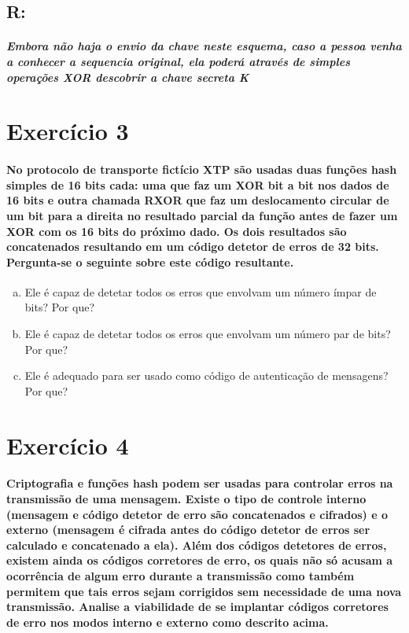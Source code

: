 \documentclass[10pt,a4paper]{report}
\begin{document}
\subsection*{R:}
\subparagraph{Embora não haja o envio da chave neste esquema, caso a pessoa venha a conhecer a sequencia original, ela poderá através de simples operações XOR descobrir a chave secreta K}

\section*{Exercício 3}
\paragraph{ No protocolo de transporte fictício XTP são usadas duas funções hash simples de 16 bits cada: uma que faz um XOR bit a bit nos dados de 16 bits e outra chamada RXOR que faz um deslocamento circular de um bit para a direita no resultado parcial da função antes de fazer um XOR com os 16 bits do próximo dado. Os dois resultados são concatenados resultando em um código detetor de erros de 32 bits. Pergunta-se o seguinte sobre este código resultante.}
\begin{enumerate}[(a)]
\item Ele é capaz de detetar todos os erros que envolvam um número ímpar de bits? Por que?
\item Ele é capaz de detetar todos os erros que envolvam um número par de bits? Por que?
\item Ele é adequado para ser usado como código de autenticação de mensagens? Por que?
\end{enumerate}

\section*{Exercício 4}
\paragraph{ Criptografia e funções hash podem ser usadas para controlar erros na transmissão de uma mensagem. Existe o tipo de controle interno (mensagem e código detetor de erro são concatenados e cifrados) e o externo (mensagem é cifrada antes do código detetor de erros ser calculado e concatenado a ela). Além dos códigos detetores de erros, existem ainda os códigos corretores de erro, os quais não só acusam a ocorrência de algum erro durante a transmissão como também permitem que tais erros sejam corrigidos sem necessidade de uma nova transmissão. Analise a viabilidade de se implantar códigos corretores de erro nos modos interno e externo como descrito acima.}
\end{document}
